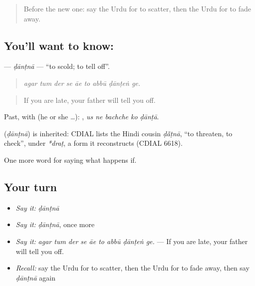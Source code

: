\label{lesson:UR-C373-dantna}



\begin{quote}
Before the new one: say the Urdu for to scatter, then the Urdu for to fade away.
\end{quote}

\subsection*{You'll want to know: }
\textbf{} — \emph{ḍānṭnā} — \textquotedblleft{}to scold; to tell off\textquotedblright{}.

\begin{quote}
        
\end{quote}

\begin{quote}
\emph{agar tum der se āe to abbū ḍānṭeṅ ge.}
\end{quote}

\begin{quote}
If you are late, your father will tell you off.
\end{quote}

Past, with  (he or she …):     , \emph{us ne bachche ko ḍānṭā}.

\begin{cousinweb}
\textbf{} (\emph{ḍānṭnā}) is inherited: CDIAL lists the Hindi cousin \emph{ḍā̃ṭnā}, \textquotedblleft{}to threaten, to check\textquotedblright{}, under \emph{*draṭ}, a form it reconstructs (CDIAL 6618).
\end{cousinweb}

\begin{grammarlens}[title={What you've built}]
One more word for saying what happens if.
\end{grammarlens}

\subsection*{Your turn}
\begin{itemize}
\raggedright
  \item \emph{Say it:} \emph{ḍānṭnā}
  \item \emph{Say it:} \emph{ḍānṭnā}, once more
  \item \emph{Say it:} \emph{agar tum der se āe to abbū ḍānṭeṅ ge.} — If you are late, your father will tell you off.
  \item \emph{Recall:} say the Urdu for to scatter, then the Urdu for to fade away, then say \emph{ḍānṭnā} again
\end{itemize}

